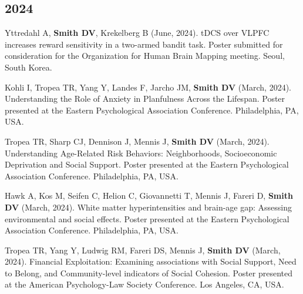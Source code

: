 \documentclass[11pt, letterpaper]{article}
\begin{document}
\subsection*{2024}
\begin{hangparas}{.5in}{1}

Yttredahl A, \textbf{Smith DV}, Krekelberg B (June, 2024). tDCS over VLPFC increases reward sensitivity in a two-armed bandit task. Poster submitted for consideration for the Organization for Human Brain Mapping meeting. Seoul, South Korea.

Kohli I, Tropea TR, Yang Y, Landes F, Jarcho JM, \textbf{Smith DV} (March, 2024). Understanding the Role of Anxiety in Planfulness Across the Lifespan. Poster presented at the Eastern Psychological Association Conference. Philadelphia, PA, USA.

Tropea TR, Sharp CJ, Dennison J, Mennis J, \textbf{Smith DV} (March, 2024). Understanding Age-Related Risk Behaviors: Neighborhoods, Socioeconomic Deprivation and Social Support. Poster presented at the Eastern Psychological Association Conference. Philadelphia, PA, USA. 

Hawk A, Kos M, Seifen C, Helion C, Giovannetti T, Mennis J, Fareri D, \textbf{Smith DV} (March, 2024). White matter hyperintensities and brain-age gap: Assessing environmental and social effects. Poster presented at the Eastern Psychological Association Conference. Philadelphia, PA, USA.

Tropea TR, Yang Y, Ludwig RM, Fareri DS, Mennis J, \textbf{Smith DV} (March, 2024). Financial Exploitation: Examining associations with Social Support, Need to Belong, and Community-level indicators of Social Cohesion. Poster presented at the American Psychology-Law Society Conference. Los Angeles, CA, USA. \\

\end{hangparas}
\end{document}
